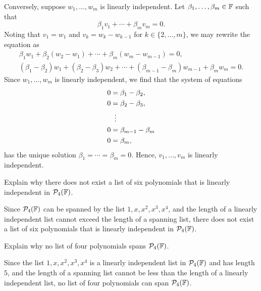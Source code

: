 \begin{exc}
\begin{solution}
Conversely, suppose $w_1,\dots,w_m$ is linearly independent. Let
$\beta_1,\dots,\beta_m\in\mathbb{F}$ such that
\[ \beta_1v_1+\cdots+\beta_mv_m=0. \]
Noting that $v_1=w_1$ and $v_k=w_k-w_{k-1}$ for $k\in\{2,\dots,m\}$, we may
rewrite the equation as
\begin{gather*}
\beta_1w_1+\beta_2(w_2-w_1)+\cdots+\beta_m(w_m-w_{m-1})=0,\\
(\beta_1-\beta_2)w_1+(\beta_2-\beta_3)w_2+\cdots+(\beta_{m-1}-\beta_m)w_{m-1}
+\beta_mw_m=0.
\end{gather*}
Since $w_1,\dots,w_m$ is linearly independent, we find that the system of
equations
\begin{align*}
0 &= \beta_1-\beta_2,\\
0 &= \beta_2-\beta_3,\\
  &\vdotswithin{=}\\
0 &= \beta_{m-1}-\beta_m\\
0 &= \beta_m,
\end{align*}
has the unique solution $\beta_1=\cdots=\beta_m=0$. Hence, $v_1,\dots,v_m$ is
linearly independent.
\end{solution}

\begin{exercise}
Explain why there does not exist a list of six polynomials that is linearly
independent in $\mathcal{P}_4(\mathbb{F})$.
\end{exercise}
\begin{solution}
Since $\mathcal{P}_4(\mathbb{F})$ can be spanned by the list $1,x,x^2,x^3,x^4$, and the
length of a linearly independent list cannot exceed the length of a spanning
list, there does not exist a list of six polynomials that is linearly
independent in $\mathcal{P}_4(\mathbb{F})$.
\end{solution}

\begin{exercise}
Explain why no list of four polynomials spans $\mathcal{P}_4(\mathbb{F})$.
\end{exercise}
\begin{solution}
Since the list $1,x,x^2,x^3,x^4$ is a linearly independent list in
$\mathcal{P}_4(\mathbb{F})$ and has length $5$, and the length of a spanning list cannot be
less than the length of a linearly independent list, no list of four
polynomials can span $\mathcal{P}_4(\mathbb{F})$.
\end{solution}


\end{exc}
